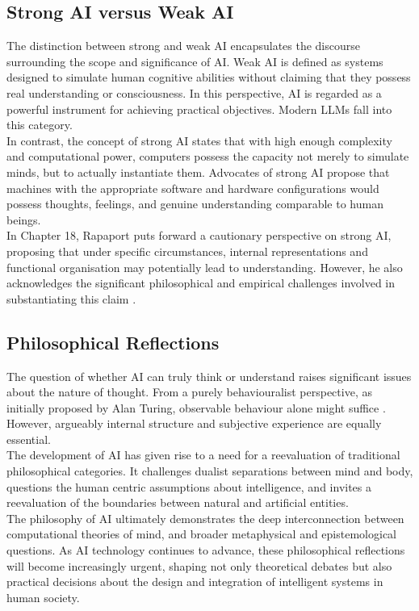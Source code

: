 \documentclass[runningheads]{llncs}
\begin{document}
\subsection{Strong AI versus Weak AI}
%
The distinction between strong and weak AI encapsulates the discourse surrounding the scope and significance of AI. Weak AI is defined as systems designed to simulate human cognitive abilities without claiming that they possess real understanding or consciousness. In this perspective, AI is regarded as a powerful instrument for achieving practical objectives. Modern LLMs fall into this category.
\\
In contrast, the concept of strong AI states that with high enough complexity and computational power, computers possess the capacity not merely to simulate minds, but to actually instantiate them. Advocates of strong AI propose that machines with the appropriate software and hardware configurations would possess thoughts, feelings, and genuine understanding comparable to human beings.
\\
In Chapter 18, Rapaport puts forward a cautionary perspective on strong AI, proposing that under specific circumstances, internal representations and functional organisation may potentially lead to understanding. However, he also acknowledges the significant philosophical and empirical challenges involved in substantiating this claim
\cite{rapaport}.
%
%
\subsection{Philosophical Reflections}
%
The question of whether AI can truly think or understand raises significant issues about the nature of thought. From a purely behaviouralist perspective, as initially proposed by Alan Turing, observable behaviour alone might suffice
\cite{russell}. 
However, argueably internal structure and subjective experience are equally essential.
\\
The development of AI has given rise to a need for a reevaluation of traditional philosophical categories. It challenges dualist separations between mind and body, questions the human centric assumptions about intelligence, and invites a reevaluation of the boundaries between natural and artificial entities.
\\
The philosophy of AI ultimately demonstrates the deep interconnection between computational theories of mind, and broader metaphysical and epistemological questions. As AI technology continues to advance, these philosophical reflections will become increasingly urgent, shaping not only theoretical debates but also practical decisions about the design and integration of intelligent systems in human society.
%
%
%
%
%
\end{document}
